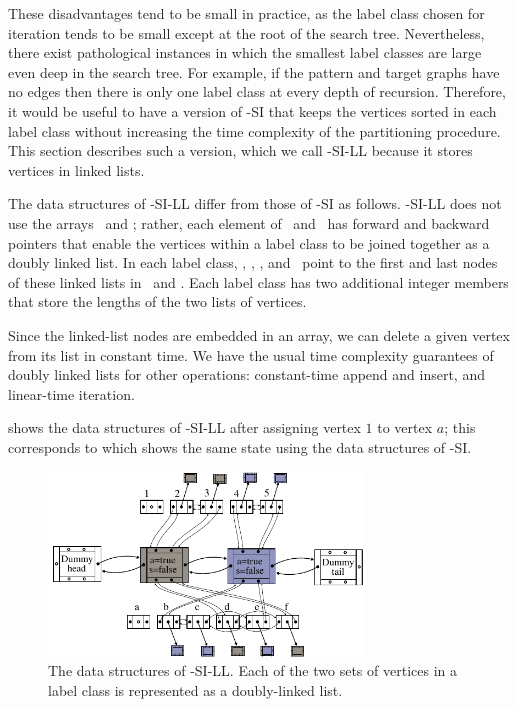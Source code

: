 These disadvantages tend to be small in practice, as the label class chosen for
iteration tends to be small except at the root of the search tree.
Nevertheless, there exist pathological instances in which the smallest label
classes are large even deep in the search tree.  For example, if the pattern
and target graphs have no edges then there is only one label class at every
depth of recursion.  Therefore, it would be useful to have a version of
\McSplit-SI that keeps the vertices sorted in each label class without increasing
the time complexity of the partitioning procedure.  This section describes
such a version, which we call \McSplit-SI-LL because it stores
vertices in linked lists.

The data structures of \McSplit-SI-LL differ from those of \McSplit-SI as
follows.  \McSplit-SI-LL does not use the arrays \Garray\ and \Harray; rather,
each element of \Gptrs\ and \Hptrs\ has forward and backward pointers that
enable the vertices within a label class to be joined together as a doubly
linked list.  In each label class, \varStartG, \varEndG, \varStartH, and
\varEndH\ point to the first and last nodes of these linked lists in \Gptrs\
and \Hptrs.  Each label class has two additional integer members that store the
lengths of the two lists of vertices.

Since the linked-list nodes are embedded in an array, we can delete a given
vertex from its list in constant time.  We have the usual time complexity
guarantees of doubly linked lists for other operations: constant-time
append and insert, and linear-time iteration.

shows the data structures of \McSplit-SI-LL after assigning vertex $1$ to vertex $a$;
this corresponds to \Cref{figure:si-data-structures} which shows the same state
using the data structures of \McSplit-SI.

\begin{figure}[htb]
    \centering
    \includegraphics*[width=0.75\textwidth]{14b-mcsplit-induced-si/figs/data-structure-step-1-ll-version}
    \caption{The data structures of \McSplit-SI-LL. Each of the two sets of vertices in a label
        class is represented as a doubly-linked list.}
    \label{figure:si-data-structures-ll-version}
\end{figure}

